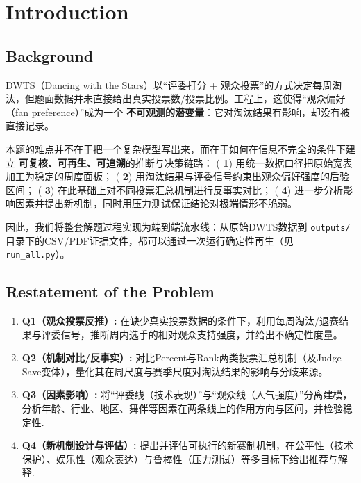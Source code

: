 \section{Introduction}
\subsection{Background}

DWTS（Dancing with the Stars）以“评委打分 + 观众投票”的方式决定每周淘汰，但题面数据并未直接给出真实投票数/投票比例。工程上，这使得“观众偏好（fan preference）”成为一个 \textbf{不可观测的潜变量}：它对淘汰结果有影响，却没有被直接记录。

本题的难点并不在于把一个复杂模型写出来，而在于如何在信息不完全的条件下建立 \textbf{可复核、可再生、可追溯}的推断与决策链路：
( \textbf{1}) 用统一数据口径把原始宽表加工为稳定的周度面板；
( \textbf{2}) 用淘汰结果与评委信号约束出观众偏好强度的后验区间；
( \textbf{3}) 在此基础上对不同投票汇总机制进行反事实对比；
( \textbf{4}) 进一步分析影响因素并提出新机制，同时用压力测试保证结论对极端情形不脆弱。

因此，我们将整套解题过程实现为端到端流水线：从原始DWTS数据到 \texttt{outputs/}目录下的CSV/PDF证据文件，都可以通过一次运行确定性再生（见 \texttt{run\_all.py}）。

\subsection{Restatement of the Problem}
\begin{enumerate}
	\item \textbf{Q1（观众投票反推）:} 在缺少真实投票数据的条件下，利用每周淘汰/退赛结果与评委信号，推断周内选手的相对观众支持强度，并给出不确定性度量。
	\item \textbf{Q2（机制对比/反事实）:} 对比Percent与Rank两类投票汇总机制（及Judge Save变体），量化其在周尺度与赛季尺度对淘汰结果的影响与分歧来源。
	\item \textbf{Q3（因素影响）:} 将“评委线（技术表现）”与“观众线（人气强度）”分离建模，分析年龄、行业、地区、舞伴等因素在两条线上的作用方向与区间，并检验稳定性.
	\item \textbf{Q4（新机制设计与评估）:} 提出并评估可执行的新赛制机制，在公平性（技术保护）、娱乐性（观众表达）与鲁棒性（压力测试）等多目标下给出推荐与解释.
\end{enumerate}

